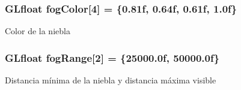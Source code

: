 \subsubsection[{fogColor}]{\setlength{\rightskip}{0pt plus 5cm}GLfloat {\bf fogColor}[4] = \{0.81f, 0.64f, 0.61f, 1.0f\}}\label{main_8c_a8e753e0bde61b66d622c8c1dd6a3a261}
Color de la niebla 
\subsubsection[{fogRange}]{\setlength{\rightskip}{0pt plus 5cm}GLfloat {\bf fogRange}[2] = \{25000.0f, 50000.0f\}}\label{main_8c_aace75dc6535d69bd15d6e9cc159f7d96}
Distancia mínima de la niebla y distancia máxima visible 